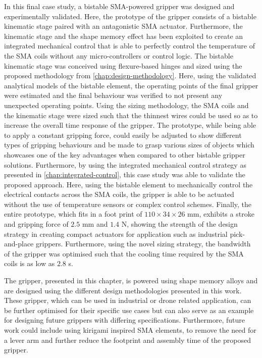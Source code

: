 In this final case study, a bistable SMA-powered gripper was designed and experimentally validated. Here, the prototype of the gripper consists of a bistable kinematic stage paired with an antagonistic SMA actuator. Furthermore, the kinematic stage and the shape memory effect has been exploited to create an integrated mechanical control that is able to perfectly control the temperature of the SMA coils without any micro-controllers or control logic. The bistable kinematic stage was conceived using flexure-based hinges and sized using the proposed methodology from \cref{chap:design-methodology}. Here, using the validated analytical models of the bistable element, the operating points of the final gripper were estimated and the final behaviour was verified to not present any unexpected operating points. Using the sizing methodology, the SMA coils and the kinematic stage were sized such that the thinnest wires could be used so as to increase the overall time response of the gripper. The prototype, while being able to apply a constant gripping force, could easily be adjusted to show different types of gripping behaviours and be made to grasp various sizes of objects which showcases one of the key advantages when compared to other bistable gripper solutions. Furthermore, by using the integrated mechanical control strategy as presented in \cref{chap:integrated-control}, this case study was able to validate the proposed approach. Here, using the bistable element to mechanically control the electrical contacts across the SMA coils, the gripper is able to be actuated without the use of temperature sensors or complex control schemes. Finally, the entire prototype, which fits in a foot print of $110\times34\times26$ mm, exhibits a stroke and gripping force of $2.5$ mm and $1.4$ N, showing the strength of the design strategy in creating compact actuators for application such as industrial pick-and-place grippers. Furthermore, using the novel sizing strategy, the bandwidth of the gripper was optimised such that the cooling time required by the SMA coils is as low as $2.8$ s.

The gripper, presented in this chapter, is powered using shape memory alloys and are designed using the different design methodologies presented in this work. These gripper, which can be used in industrial or drone related application, can be further optimised for their specific use cases but can also serve as an example for designing future grippers with differing specifications. Furthermore, future work could include using kirigami inspired SMA elements, to remove the need for a lever arm and further reduce the footprint and assembly time of the proposed gripper.


